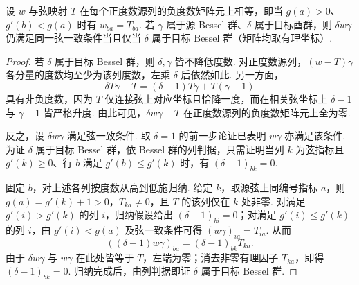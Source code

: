 \begin{lemma}[保持弦一致条件的目标变换]
\label{lem:a-bessel-chord-stabilizer}
\emitthmsource
设 $w$ 与弦映射 $T$ 在每个正度数源列的负度数矩阵元上相等，即当 $g(a)>0$、$g'(b)<g(a)$ 时有 $w_{ba}=T_{ba}$. 若 $\gamma$ 属于源 Bessel 群、$\delta$ 属于目标酉群，则 $\delta w\gamma$ 仍满足同一弦一致条件当且仅当 $\delta$ 属于目标 Bessel 群（矩阵均取有理坐标）.
\end{lemma}
\begin{proof}
若 $\delta$ 属于目标 Bessel 群，则 $\delta,\gamma$ 皆不降低度数. 对正度数源列，$(w-T)\gamma$ 各分量的度数均至少为该列度数，左乘 $\delta$ 后依然如此. 另一方面，
\[
 \delta T\gamma-T=(\delta-1)T\gamma+T(\gamma-1)
\]
具有非负度数，因为 $T$ 仅连接弦上对应坐标且恰降一度，而在相关弦坐标上 $\delta-1$ 与 $\gamma-1$ 皆严格升度. 由此可见，$\delta w\gamma-T$ 在正度数源列的负度数矩阵元上全为零.

反之，设 $\delta w\gamma$ 满足弦一致条件. 取 $\delta=1$ 的前一步论证已表明 $w\gamma$ 亦满足该条件. 为证 $\delta$ 属于目标 Bessel 群，依 Bessel 群的列判据，只需证明当列 $k$ 为弦指标且 $g'(k)\ge0$、行 $b$ 满足 $g'(b)\le g'(k)$ 时，有 $(\delta-1)_{bk}=0$.

固定 $b$，对上述各列按度数从高到低施归纳. 给定 $k$，取源弦上同编号指标 $a$，则 $g(a)=g'(k)+1>0$，$T_{ka}\ne0$，且 $T$ 的该列仅在 $k$ 处非零. 对满足 $g'(i)>g'(k)$ 的列 $i$，归纳假设给出 $(\delta-1)_{bi}=0$；对满足 $g'(i)\le g'(k)$ 的列 $i$，由 $g'(i)<g(a)$ 及弦一致条件可得 $(w\gamma)_{ia}=T_{ia}$. 从而
\[
 ((\delta-1)w\gamma)_{ba}=(\delta-1)_{bk}T_{ka}.
\]
由于 $\delta w\gamma$ 与 $w\gamma$ 在此处皆等于 $T$，左端为零；消去非零有理因子 $T_{ka}$，即得 $(\delta-1)_{bk}=0$. 归纳完成后，由列判据即证 $\delta$ 属于目标 Bessel 群.
\end{proof}


